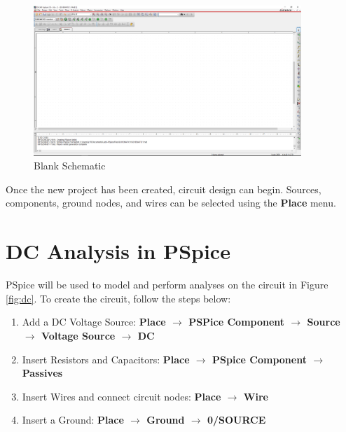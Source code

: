 \documentclass[12pt]{../manual}
\begin{document}
\begin{figure}[ht!]
	\begin{center}
		\includegraphics[width=0.9\textwidth]{./figures/BlankSchematic.PNG}
	\end{center}
	\caption{Blank Schematic}
	\label{fig:blankSchematic}
\end{figure}

Once the new project has been created, circuit design can begin. Sources, components, ground nodes, and wires can be selected using the {\bf Place} menu.

%
\newpage
\section{DC Analysis in PSpice}

PSpice will be used to model and perform analyses on the circuit in Figure \ref{fig:dc}. To create the circuit, follow the steps below:
\begin{enumerate}
	\item Add a DC Voltage Source: \textbf{Place $\to$ PSPice Component $\to$ Source $\to$ Voltage Source $\to$ DC}
	\item Insert Resistors and Capacitors: \textbf{Place $\to$ PSpice Component $\to$ Passives}
	\item Insert Wires and connect circuit nodes: \textbf{Place $\to$ Wire}
	\item Insert a Ground: \textbf{Place $\to$ Ground $\to$ 0/SOURCE}
\end{enumerate}
\end{document}
